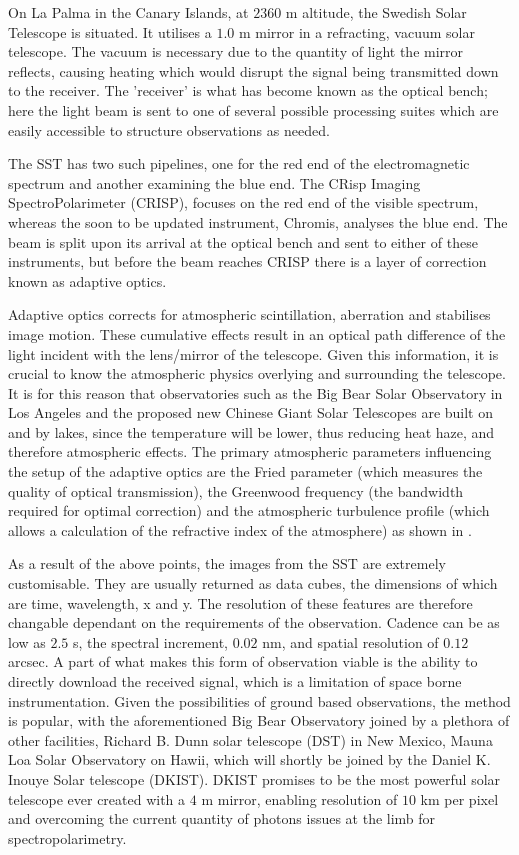 On La Palma in the Canary Islands, at $2360$ m altitude, the Swedish Solar Telescope is situated.
It utilises a $1.0$ m mirror in a refracting, vacuum solar telescope.
The vacuum is necessary due to the quantity of light the mirror reflects, causing heating which would disrupt the signal being transmitted down to the receiver.
The 'receiver' is what has become known as the optical bench; here the light beam is sent to one of several possible processing suites which are easily accessible to structure observations as needed.

The SST has two such pipelines, one for the red end of the electromagnetic spectrum and another examining the blue end.
The CRisp Imaging SpectroPolarimeter (CRISP), focuses on the red end of the visible spectrum, whereas the soon to be updated instrument, Chromis, analyses the blue end.
The beam is split upon its arrival at the optical bench and sent to either of these instruments, but before the beam reaches CRISP there is a layer of correction known as adaptive optics.

Adaptive optics corrects for atmospheric scintillation, aberration and stabilises image motion.
These cumulative effects result in an optical path difference of the light incident with the lens/mirror of the telescope.
Given this information, it is crucial to know the atmospheric physics overlying and surrounding the telescope.
It is for this reason that observatories such as the Big Bear Solar Observatory \citep{Cao2010} in Los Angeles and the proposed new Chinese Giant Solar Telescopes \citep{Liu2014} are built on and by lakes, since the temperature will be lower, thus reducing heat haze, and therefore atmospheric effects.
The primary atmospheric parameters influencing the setup of the adaptive optics are the Fried parameter (which measures the quality of optical transmission), the Greenwood frequency (the bandwidth required for optimal correction) and the atmospheric turbulence profile (which allows a calculation of the refractive index of the atmosphere) as shown in \cite{Rimmele2011}.

As a result of the above points, the images from the SST are extremely customisable.
They are usually returned as data cubes, the dimensions of which are time, wavelength, x and y.
The resolution of these features are therefore changable dependant on the requirements of the observation.
Cadence can be as low as $2.5$ s, the spectral increment, $0.02$ nm, and spatial resolution of $0.12$ arcsec.
A part of what makes this form of observation viable is the ability to directly download the received signal, which is a limitation of space borne instrumentation.
Given the possibilities of ground based observations, the method is popular, with the aforementioned Big Bear Observatory joined by a plethora of other facilities, Richard B. Dunn solar telescope (DST) in New Mexico, Mauna Loa Solar Observatory on Hawii, which will shortly be joined by the Daniel K. Inouye Solar telescope (DKIST).
DKIST promises to be the most powerful solar telescope ever created with a $4$ m mirror, enabling resolution of $10$ km per pixel and overcoming the current quantity of photons issues at the limb for spectropolarimetry.



